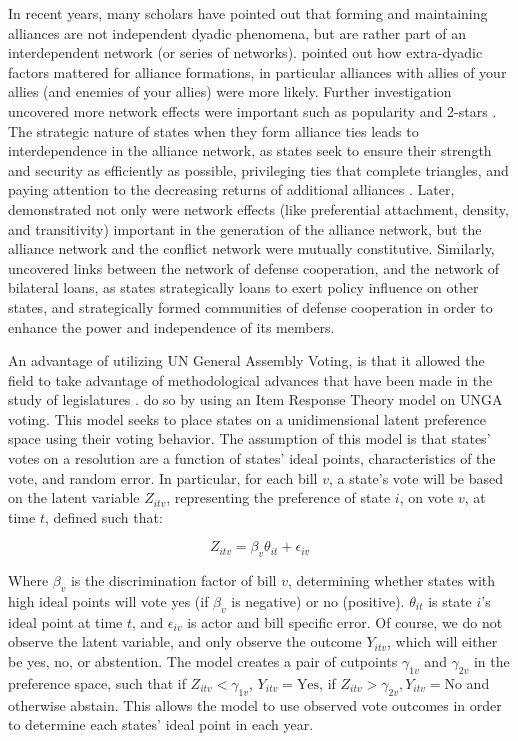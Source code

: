 In recent years, many scholars have pointed out that forming and maintaining alliances are not independent dyadic phenomena, but are rather part of an interdependent network (or series of networks). \citet{warren:2010} pointed out how extra-dyadic factors mattered for alliance formations, in particular alliances with allies of your allies (and enemies of your allies) were more likely. Further investigation uncovered more network effects were important such as popularity and 2-stars \citep{cranmer:etal:2015}. The strategic nature of states when they form alliance ties leads to interdependence in the alliance network, as states seek to ensure their strength and security as efficiently as possible, privileging ties that complete triangles, and paying attention to the decreasing returns of additional alliances \citep{cranmer:etal:2012}. Later, \citet{warren:2016} demonstrated not only were network effects (like preferential attachment, density, and transitivity) important in the generation of the alliance network, but the alliance network and the conflict network were mutually constitutive. Similarly, \citet{kinne:bunte:2018} uncovered links between the network of defense cooperation, and the network of bilateral loans, as states strategically loans to exert policy influence on other states, and strategically formed communities of defense cooperation in order to enhance the power and independence of its members. 

An advantage of utilizing UN General Assembly Voting, is that it allowed the field to take advantage of methodological advances that have been made in the study of legislatures \citep{poole:rosenthal:1985}. \citet{bailey:etal:2015} do so by using an Item Response Theory model on UNGA voting. This model seeks to place states on a unidimensional latent preference space using their voting behavior. The assumption of this model is that states' votes on a resolution are a function of states' ideal points, characteristics of the vote, and random error. In particular, for each bill $v$, a state's vote will be based on the latent variable $Z_{itv}$, representing the preference of state $i$, on vote $v$, at time $t$, defined such that:

\begin{equation}
	Z_{itv} = \beta_{v}\theta_{it} + \epsilon_{iv}
\end{equation}

\noindent Where $\beta_{v}$ is the discrimination factor of bill $v$, determining whether states with high ideal points will vote yes (if $\beta_{v}$ is negative) or no (positive). $\theta_{it}$ is state $i$'s ideal point at time $t$, and $\epsilon_{iv}$ is actor and bill specific error. Of course, we do not observe the latent variable, and only observe the outcome $Y_{itv}$, which will either be yes, no, or abstention. The model creates a pair of cutpoints $\gamma_{1v}$ and $\gamma_{2v}$ in the preference space, such that  if $Z_{itv} < \gamma_{1v}$, $Y_{itv} = \text{Yes}$, if $Z_{itv} > \gamma_{2v}, Y_{itv} = \text{No}$ and otherwise abstain. This allows the model to use observed vote outcomes in order to determine each states' ideal point in each year.

